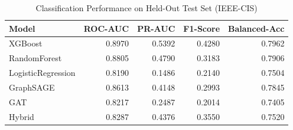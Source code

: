 \begin{table}
\caption{Classification Performance on Held-Out Test Set (IEEE-CIS)}
\label{tab:classification_metrics}
\begin{tabular}{lrrrr}
\toprule
Model & ROC-AUC & PR-AUC & F1-Score & Balanced-Acc \\
\midrule
XGBoost & 0.8970 & 0.5392 & 0.4280 & 0.7962 \\
RandomForest & 0.8805 & 0.4790 & 0.3183 & 0.7906 \\
LogisticRegression & 0.8190 & 0.1486 & 0.2140 & 0.7504 \\
GraphSAGE & 0.8613 & 0.4148 & 0.2993 & 0.7845 \\
GAT & 0.8217 & 0.2487 & 0.2014 & 0.7405 \\
Hybrid & 0.8287 & 0.4376 & 0.3550 & 0.7520 \\
\bottomrule
\end{tabular}
\end{table}
